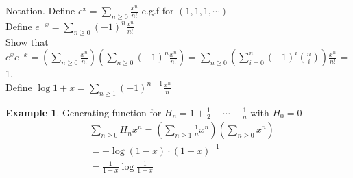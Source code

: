 \documentclass{article}
\theoremstyle{definition}
\newtheorem{ex}{Example}[]
\begin{document}
Notation.
Define
$ e^x = \sum_{n\ge0} \frac{x^n}{n!}$ e.g.f for $(1,1,1, \cdots)$ \\ 
Define $e^{-x} = \sum_{n\ge0} (-1)^n \frac{x^n}{n!}$ \\ 
Show that $e^x e^{-x} = \left( \sum_{n\ge 0} \frac{x^n}{n!}\right)\left( \sum_{n\ge 0} (-1)^n  \frac{x^n}{n!}\right) = \sum_{n\ge 0} \left( \sum_{i=0}^n (-1)^i { n \choose i} \right) \frac{x^n}{n!}$ = 1. \\ 
Define $\log{1+x} = \sum_{n\ge 1} (-1)^{n-1} \frac{x^n}{n} $ \\ 
\begin{ex}
Generating function for $H_n = 1 + \frac{1}{2} + \cdots + \frac{1}{n}$ with $ H_0 = 0$ 
\begin{align*}
    &\sum_{n\ge 0} H_n x^n = \left( \sum_{n\ge 1} \frac{1}{n}x^n \right) \left( \sum_{n\ge 0 } x^n \right) \\
    & = -\log{(1-x)} \cdot (1-x)^{-1} \\ 
    & = \frac{1}{1-x}\log{\frac{1}{1-x}}
\end{align*}
\end{ex}
\end{document}
